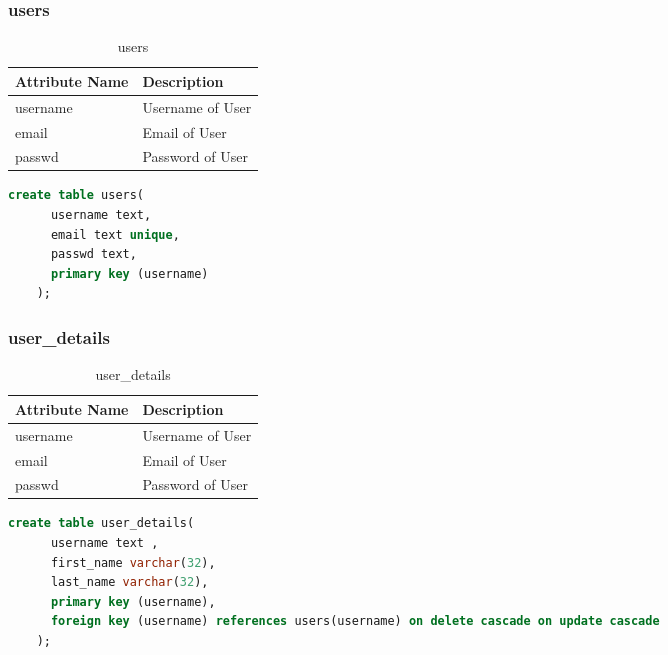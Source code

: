 \documentclass[10pt]{article}
\begin{document}
\subsubsection{users}
\begin{table}[!ht]
    \centering
    \begin{tabular}{|l|l|}
         \hline
         \textbf{Attribute Name} & \textbf{Description} \\
         \hline
         username & Username of User  \\
         \hline
         email &  Email of User\\
         \hline
         passwd &  Password of User\\
         \hline
    \end{tabular}
    \caption{users}
    \label{tab:my_label5}
\end{table}

\begin{lstlisting}[language=SQL,
        deletekeywords={IDENTITY,INT},
        morekeywords={clustered},    
        framesep=10pt,
        framextopmargin=10pt]
    create table users(
      username text,
      email text unique,
      passwd text,
      primary key (username)
    );
\end{lstlisting}

\subsubsection{user\_details}
\begin{table}[!ht]
    \centering
    \begin{tabular}{|l|l|}
         \hline
         \textbf{Attribute Name} & \textbf{Description} \\
         \hline
         username & Username of User  \\
         \hline
         email &  Email of User\\
         \hline
         passwd &  Password of User\\
         \hline
    \end{tabular}
    \caption{user\_details}
    \label{tab:my_label6}
\end{table}

\begin{lstlisting}[language=SQL,
        deletekeywords={IDENTITY,INT},
        morekeywords={clustered},    
        framesep=10pt,
        framextopmargin=10pt]
    create table user_details(
      username text ,
      first_name varchar(32),
      last_name varchar(32),
      primary key (username),
      foreign key (username) references users(username) on delete cascade on update cascade
    );
\end{lstlisting}
\end{document}
